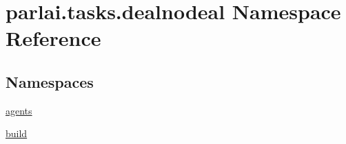 \hypertarget{namespaceparlai_1_1tasks_1_1dealnodeal}{}\section{parlai.\+tasks.\+dealnodeal Namespace Reference}
\label{namespaceparlai_1_1tasks_1_1dealnodeal}
\subsection*{Namespaces}
\begin{DoxyCompactItemize}
\item 
 \hyperlink{namespaceparlai_1_1tasks_1_1dealnodeal_1_1agents}{agents}
\item 
 \hyperlink{namespaceparlai_1_1tasks_1_1dealnodeal_1_1build}{build}
\end{DoxyCompactItemize}
